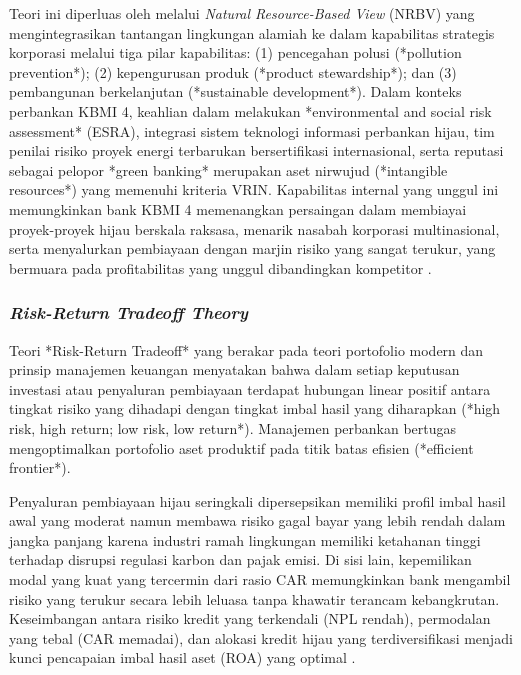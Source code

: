 \documentclass[12pt,a4paper]{article}
\numberwithin{equation}{section}
\begin{document}
\noindent
Teori ini diperluas oleh \citet{Hart1995} melalui \emph{Natural Resource-Based View} (NRBV) yang mengintegrasikan tantangan lingkungan alamiah ke dalam kapabilitas strategis korporasi melalui tiga pilar kapabilitas: (1) pencegahan polusi (*pollution prevention*); (2) kepengurusan produk (*product stewardship*); dan (3) pembangunan berkelanjutan (*sustainable development*). Dalam konteks perbankan KBMI 4, keahlian dalam melakukan *environmental and social risk assessment* (ESRA), integrasi sistem teknologi informasi perbankan hijau, tim penilai risiko proyek energi terbarukan bersertifikasi internasional, serta reputasi sebagai pelopor *green banking* merupakan aset nirwujud (*intangible resources*) yang memenuhi kriteria VRIN. Kapabilitas internal yang unggul ini memungkinkan bank KBMI 4 memenangkan persaingan dalam membiayai proyek-proyek hijau berskala raksasa, menarik nasabah korporasi multinasional, serta menyalurkan pembiayaan dengan marjin risiko yang sangat terukur, yang bermuara pada profitabilitas yang unggul dibandingkan kompetitor \citep{Zhang2022, Hart1995}.

\subsubsection{\emph{Risk-Return Tradeoff Theory}}
\noindent
Teori *Risk-Return Tradeoff* yang berakar pada teori portofolio modern \citet{Markowitz1952} dan prinsip manajemen keuangan \citet{BrighamEhrhardt2020} menyatakan bahwa dalam setiap keputusan investasi atau penyaluran pembiayaan terdapat hubungan linear positif antara tingkat risiko yang dihadapi dengan tingkat imbal hasil yang diharapkan (*high risk, high return; low risk, low return*). Manajemen perbankan bertugas mengoptimalkan portofolio aset produktif pada titik batas efisien (*efficient frontier*).

\noindent
Penyaluran pembiayaan hijau seringkali dipersepsikan memiliki profil imbal hasil awal yang moderat namun membawa risiko gagal bayar yang lebih rendah dalam jangka panjang karena industri ramah lingkungan memiliki ketahanan tinggi terhadap disrupsi regulasi karbon dan pajak emisi. Di sisi lain, kepemilikan modal yang kuat yang tercermin dari rasio CAR memungkinkan bank mengambil risiko yang terukur secara lebih leluasa tanpa khawatir terancam kebangkrutan. Keseimbangan antara risiko kredit yang terkendali (NPL rendah), permodalan yang tebal (CAR memadai), dan alokasi kredit hijau yang terdiversifikasi menjadi kunci pencapaian imbal hasil aset (ROA) yang optimal \citep{BrighamHouston2021, Chiaramonte2020}.
\end{document}
